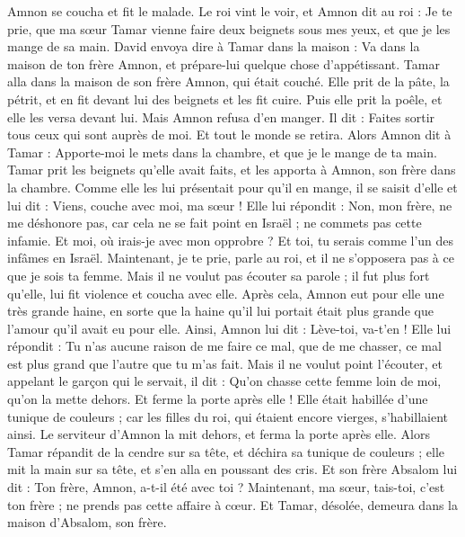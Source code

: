 \begin{multicols}{2}
Amnon se coucha et fit le malade. Le roi vint le voir, et Amnon dit au roi : Je te prie, que ma sœur Tamar vienne faire deux beignets sous mes yeux, et que je les mange de sa main.
David envoya dire à Tamar dans la maison : Va dans la maison de ton frère Amnon, et prépare-lui quelque chose d’appétissant.
Tamar alla dans la maison de son frère Amnon, qui était couché. Elle prit de la pâte, la pétrit, et en fit devant lui des beignets et les fit cuire.
Puis elle prit la poêle, et elle les versa devant lui. Mais Amnon refusa d'en manger. Il dit : Faites sortir tous ceux qui sont auprès de moi. Et tout le monde se retira.
Alors Amnon dit à Tamar : Apporte-moi le mets dans la chambre, et que je le mange de ta main. Tamar prit les beignets qu'elle avait faits, et les apporta à Amnon, son frère dans la chambre.
Comme elle les lui présentait pour qu’il en mange, il se saisit d’elle et lui dit : Viens, couche avec moi, ma sœur !
Elle lui répondit : Non, mon frère, ne me déshonore pas, car cela ne se fait point en Israël ; ne commets pas cette infamie.
Et moi, où irais-je avec mon opprobre ? Et toi, tu serais comme l’un des infâmes en Israël. Maintenant, je te prie, parle au roi, et il ne s’opposera pas à ce que je sois ta femme.
Mais il ne voulut pas écouter sa parole ; il fut plus fort qu'elle, lui fit violence et coucha avec elle.
Après cela, Amnon eut pour elle une très grande haine, en sorte que la haine qu’il lui portait était plus grande que l'amour qu’il avait eu pour elle. Ainsi, Amnon lui dit : Lève-toi, va-t’en !
Elle lui répondit : Tu n’as aucune raison de me faire ce mal, que de me chasser, ce mal est plus grand que l’autre que tu m’as fait.
Mais il ne voulut point l'écouter, et appelant le garçon qui le servait, il dit : Qu'on chasse cette femme loin de moi, qu'on la mette dehors. Et ferme la porte après elle !
Elle était habillée d'une tunique de couleurs ; car les filles du roi, qui étaient encore vierges, s’habillaient ainsi. Le serviteur d’Amnon la mit dehors, et ferma la porte après elle.
Alors Tamar répandit de la cendre sur sa tête, et déchira sa tunique de couleurs ; elle mit la main sur sa tête, et s'en alla en poussant des cris.
Et son frère Absalom lui dit : Ton frère, Amnon, a-t-il été avec toi ? Maintenant, ma sœur, tais-toi, c’est ton frère ; ne prends pas cette affaire à cœur. Et Tamar, désolée, demeura dans la maison d'Absalom, son frère.

\end{multicols}
